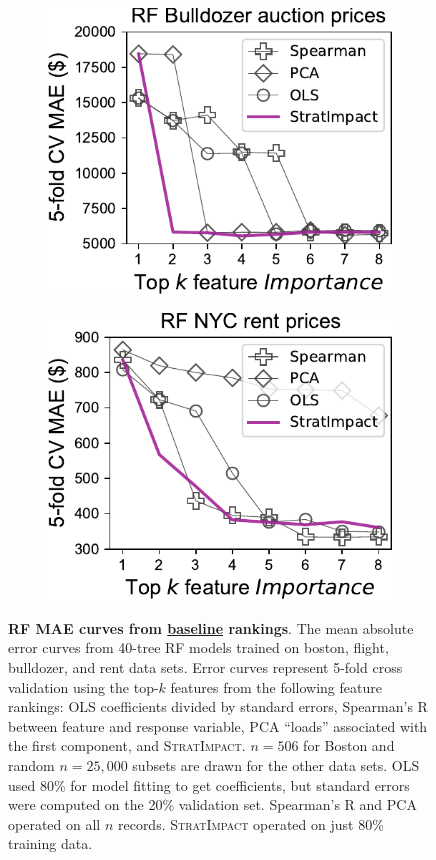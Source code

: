 \documentclass[11pt]{article}
\newcommand{\simp}{\fontfamily{cmr}\textsc{\small StratImpact}}
\begin{document}
\begin{figure}
\begin{subfigure}{.245\textwidth}
\includegraphics[scale=0.45]{images/bulldozer-topk-baseline-Importance.pdf}
\subcaption{}
\end{subfigure}
\begin{subfigure}{.245\textwidth}
    \centering
\includegraphics[scale=0.45]{images/rent-topk-baseline-Importance.pdf}
\subcaption{}
\end{subfigure} 
\caption{\small {\bf RF MAE curves from \underline{baseline} rankings}. The mean absolute error curves from 40-tree RF models trained on boston, flight, bulldozer, and rent data sets. Error curves represent 5-fold cross validation using the top-$k$ features from the following feature rankings: OLS coefficients divided by standard errors, Spearman's R between feature and response variable, PCA ``loads'' associated with the first component, and \simp{}. $n=506$ for Boston and random $n=25,000$ subsets are drawn for the other data sets. OLS used 80\% for model fitting to get coefficients, but standard errors were computed on the 20\% validation set.  Spearman's R and PCA operated on all $n$ records. \simp{} operated on just 80\% training data.}
\label{fig:baseline}
\end{figure}
\end{document}
